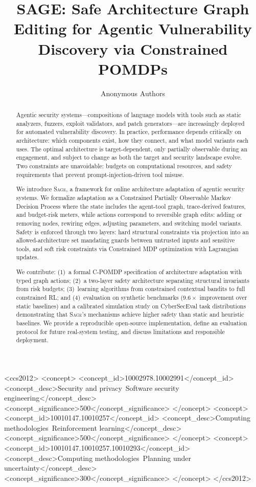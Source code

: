 \documentclass[sigconf,anonymous]{acmart}
\newcommand{\SAGE}{\textsc{Sage}\xspace}
\begin{document}
\title{SAGE: Safe Architecture Graph Editing for Agentic Vulnerability Discovery via Constrained POMDPs}

\author{Anonymous Authors}

\begin{abstract}
Agentic security systems---compositions of language models with tools such as static analyzers, fuzzers, exploit validators, and patch generators---are increasingly deployed for automated vulnerability discovery. In practice, performance depends critically on architecture: which components exist, how they connect, and what model variants each uses. The optimal architecture is target-dependent, only partially observable during an engagement, and subject to change as both the target and security landscape evolve. Two constraints are unavoidable: budgets on computational resources, and safety requirements that prevent prompt-injection-driven tool misuse.

We introduce \SAGE, a framework for online architecture adaptation of agentic security systems. We formalize adaptation as a Constrained Partially Observable Markov Decision Process where the state includes the agent-tool graph, trace-derived features, and budget-risk meters, while actions correspond to reversible graph edits: adding or removing nodes, rewiring edges, adjusting parameters, and switching model variants. Safety is enforced through two layers: hard structural constraints via projection into an allowed-architecture set mandating guards between untrusted inputs and sensitive tools, and soft risk constraints via Constrained MDP optimization with Lagrangian updates.

We contribute: (1)~a formal C-POMDP specification of architecture adaptation with typed graph actions; (2)~a two-layer safety architecture separating structural invariants from risk budgets; (3)~learning algorithms from constrained contextual bandits to full constrained RL; and (4)~evaluation on synthetic benchmarks ($9.6\times$ improvement over static baselines) and a calibrated simulation study on CyberSecEval task distributions demonstrating that \SAGE's mechanisms achieve higher safety than static and heuristic baselines. We provide a reproducible open-source implementation, define an evaluation protocol for future real-system testing, and discuss limitations and responsible deployment.
\end{abstract}

\begin{CCSXML}
<ccs2012>
<concept>
<concept_id>10002978.10002991</concept_id>
<concept_desc>Security and privacy~Software security engineering</concept_desc>
<concept_significance>500</concept_significance>
</concept>
<concept>
<concept_id>10010147.10010257</concept_id>
<concept_desc>Computing methodologies~Reinforcement learning</concept_desc>
<concept_significance>500</concept_significance>
</concept>
<concept>
<concept_id>10010147.10010257.10010293</concept_id>
<concept_desc>Computing methodologies~Planning under uncertainty</concept_desc>
<concept_significance>300</concept_significance>
</concept>
</ccs2012>
\end{CCSXML}
\end{document}
